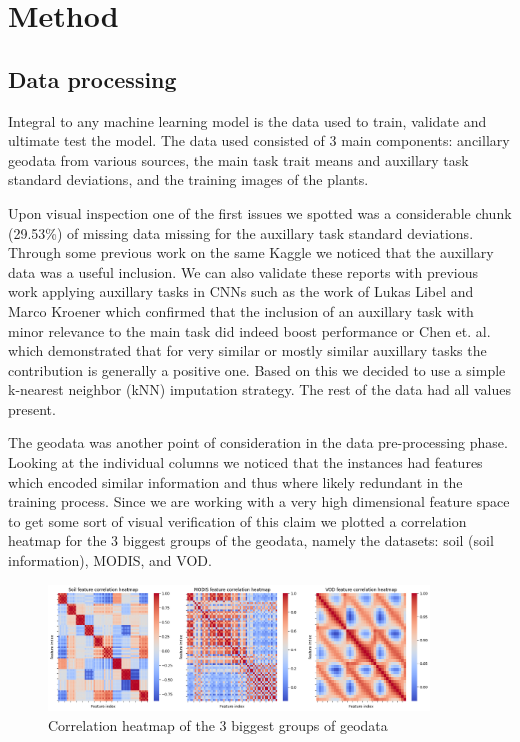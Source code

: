 \documentclass[12pt,a4paper,oneside]{article}
\begin{document}

\section{Method}

\subsection{Data processing}

Integral to any machine learning model is the data used to train, validate and ultimate test the model. The data used consisted of 3 main components: ancillary geodata from various sources, the main task trait means and auxillary task standard deviations, and the training images of the plants.

\smallskip 
Upon visual inspection one of the first issues we spotted was a considerable chunk (29.53\%) of missing data missing for the auxillary task standard deviations. Through some previous work on the same Kaggle we noticed that the auxillary data was a useful inclusion. We can also validate these reports with previous work applying auxillary tasks in CNNs such as the work of Lukas Libel and Marco Kroener which confirmed that the inclusion of an auxillary task with minor relevance to the main task did indeed boost performance \cite{lukaslibel} or Chen et. al. \cite{pmlr-v80-chen18a} which demonstrated that for very similar or mostly similar auxillary tasks the contribution is generally a positive one. Based on this we decided to use a simple k-nearest neighbor (kNN) imputation strategy. The rest of the data had all values present.

\smallskip
The geodata was another point of consideration in the data pre-processing phase. Looking at the individual columns we noticed that the instances had features which encoded similar information and thus where likely redundant in the training process. Since we are working with a very high dimensional feature space to get some sort of visual verification of this claim we plotted a correlation heatmap for the 3 biggest groups of the geodata, namely the datasets: soil (soil information), MODIS, and VOD.

\begin{figure}[!h]
    \centering
    \includegraphics[width=0.9\textwidth]{assets/corr_hm.png}
    \caption{Correlation heatmap of the 3 biggest groups of geodata}
\end{figure}
\end{document}

